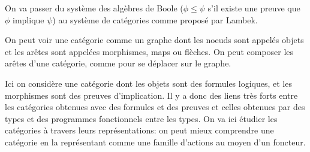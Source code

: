 \documentclass[math, info]{cours}
\begin{document}
On va passer du système des algèbres de Boole ($\phi \leq \psi$ s'il existe une preuve que $\phi$ implique $\psi$)
au système de catégories comme proposé par Lambek.
\begin{definition}
	On peut voir une catégorie comme un graphe dont les noeuds sont appelés objets et les arêtes sont appelées morphismes, maps ou flèches.
	On peut composer les arêtes d'une catégorie, comme pour se déplacer sur le graphe.
\end{definition}
Ici on considère une catégorie dont les objets sont des formules logiques, et les morphismes sont des preuves d'implication.
Il y a donc des liens très forts entre les catégories obtenues avec des formules et des preuves et celles obtenues par des types et des programmes fonctionnels entre les types.
On va ici étudier les catégories à travers leurs représentations: on peut mieux comprendre une catégorie en la représentant comme une famille d'actions au moyen d'un foncteur.
\end{document}
